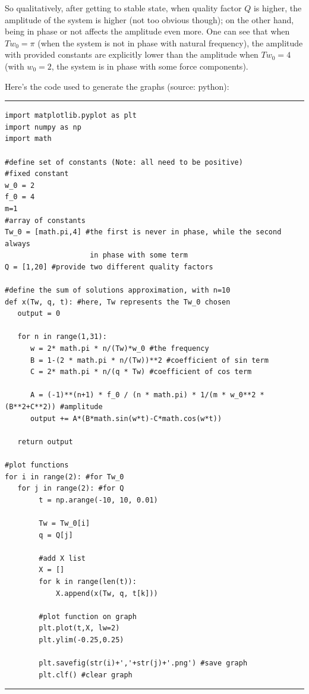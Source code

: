 \documentclass{article}
\begin{document}
So qualitatively, after getting to stable state, when quality factor $Q$ is higher, the amplitude of the system is higher (not too obvious though); on the other hand, being in phase or not affects the amplitude even more. One can see that when $Tw_0 = \pi$ (when the system is not in phase with natural frequency), the amplitude with provided constants are explicitly lower than the amplitude when $Tw_0 = 4$ (with $w_0 = 2$, the system is in phase with some force components).

\hfil

Here's the code used to generate the graphs (source: python):

\rule{15.24cm}{0.01mm}

\begin{verbatim}
import matplotlib.pyplot as plt
import numpy as np
import math

#define set of constants (Note: all need to be positive)
#fixed constant
w_0 = 2 
f_0 = 4
m=1
#array of constants
Tw_0 = [math.pi,4] #the first is never in phase, while the second always 
                    in phase with some term
Q = [1,20] #provide two different quality factors

#define the sum of solutions approximation, with n=10
def x(Tw, q, t): #here, Tw represents the Tw_0 chosen
   output = 0

   for n in range(1,31):
      w = 2* math.pi * n/(Tw)*w_0 #the frequency
      B = 1-(2 * math.pi * n/(Tw))**2 #coefficient of sin term
      C = 2* math.pi * n/(q * Tw) #coefficient of cos term

      A = (-1)**(n+1) * f_0 / (n * math.pi) * 1/(m * w_0**2 * (B**2+C**2)) #amplitude
      output += A*(B*math.sin(w*t)-C*math.cos(w*t))

   return output

#plot functions
for i in range(2): #for Tw_0
   for j in range(2): #for Q
        t = np.arange(-10, 10, 0.01)

        Tw = Tw_0[i]
        q = Q[j]

        #add X list
        X = []
        for k in range(len(t)):
            X.append(x(Tw, q, t[k]))

        #plot function on graph
        plt.plot(t,X, lw=2)
        plt.ylim(-0.25,0.25)

        plt.savefig(str(i)+','+str(j)+'.png') #save graph
        plt.clf() #clear graph
\end{verbatim}

\rule{15.24cm}{0.01mm}
\end{document}
